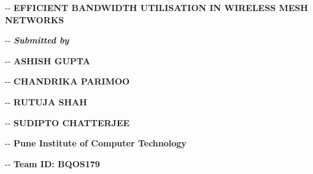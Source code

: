 \documentclass[12pt]{article}
\title{}
\makeatletter
\newenvironment{indentation}[3]%
	{\par\setlength{\parindent}{#3}
	\setlength{\leftmargin}{#1}       \setlength{\rightmargin}{#1}%
	\advance\linewidth -\leftmargin       \advance\linewidth -\rightmargin%
	\advance\@totalleftmargin\leftmargin  \@setpar{{\@@par}}%
	\parshape 1\@totalleftmargin \linewidth\ignorespaces}{\par}%
\makeatother
\begin{document}
\vspace{4cm}
\begin{center}
\begin{indentation}{0pt}{0pt}{0pt}
\textbf{{\Large EFFICIENT BANDWIDTH UTILISATION IN WIRELESS MESH NETWORKS}}
\end{indentation}
\end{center}

\vspace{0.5cm}

\begin{center}
\begin{indentation}{0pt}{0pt}{0pt}
{\normalsize{\textbf {\textit {Submitted by}}}}
\end{indentation}
\end{center}
\vspace{0.5cm}

\begin{center}
\begin{indentation}{0pt}{0pt}{0pt}
{\normalsize \bf ASHISH GUPTA}
\end{indentation}
\end{center}

\begin{center}
\begin{indentation}{0pt}{0pt}{0pt}
{\normalsize \bf CHANDRIKA PARIMOO}
\end{indentation}
\end{center}

\begin{center}
\begin{indentation}{0pt}{0pt}{0pt}
{\normalsize \bf RUTUJA SHAH}
\end{indentation}
\end{center}

\begin{center}
\begin{indentation}{0pt}{0pt}{0pt}
{\normalsize \bf SUDIPTO CHATTERJEE}
\end{indentation}
\end{center}
\vspace{1cm}

\begin{center}
\begin{indentation}{0pt}{0pt}{0pt}
{\normalsize \bf Pune Institute of Computer Technology}
\end{indentation}
\end{center}

\begin{center}
\begin{indentation}{0pt}{0pt}{0pt}
{\normalsize \bf Team ID: BQOS179}
\end{indentation}
\end{center}
\end{document}
